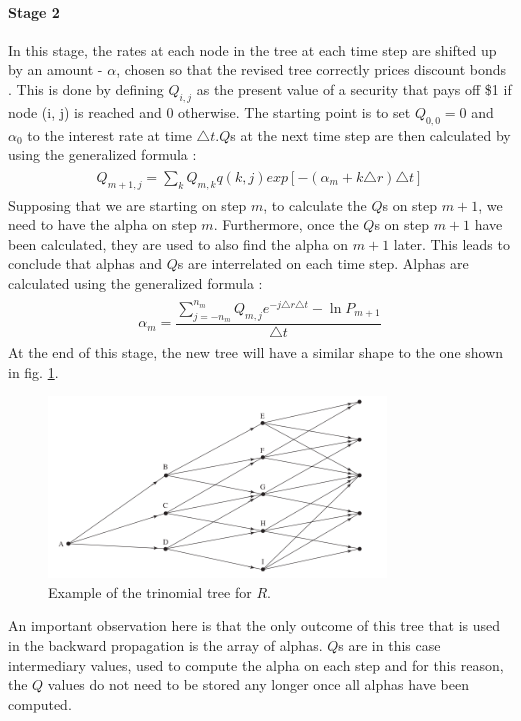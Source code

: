 \paragraph{Stage 2}
In this stage, the rates at each node in the tree at each time step are shifted up by an amount - $\alpha$, chosen so that the revised tree correctly prices discount bonds \cite[pg. 6]{uhwirt}. This is done by defining $Q_{i,j}$ as the present value of a security that pays off \$1 if node (i, j) is reached and 0 otherwise. The starting point is to set $Q_{0,0}=0$ and $\alpha_0$ to the interest rate at time $\triangle t$.$Q$s at the next time step are then calculated by using the generalized formula \cite[pg.705]{ofod}:  
\begin{equation}
\begin{gathered}
\begin{aligned}
Q_{m+1, j} = \sum_k Q_{m,k}q(k,j)exp[-(\alpha_m+k\triangle r)\triangle t]
\nonumber
\end{aligned}
\end{gathered}
\end{equation}
Supposing that we are starting on step $m$, to calculate the $Q$s on step $m+1$, we need to have the alpha on step $m$. Furthermore, once the $Q$s on step $m+1$ have been calculated, they are used to also find the alpha on $m+1$ later. This leads to conclude that alphas and $Q$s are interrelated on each time step. Alphas are calculated using the generalized formula \cite[pg.703]{ofod}:
\begin{equation}
\begin{gathered}
\begin{aligned}
\alpha_{m} = \dfrac{\sum_{j=-n_m}^{n_m} Q_{m,j}e^{-j\triangle r\triangle t} - \ln{P_{m + 1}}}{\triangle t}
\nonumber
\end{aligned}
\end{gathered}
\end{equation}
At the end of this stage, the new tree will have a similar shape to the one shown in fig. \ref{fig:treeconststage2}. 
\begin{figure}[H]
	\centering
	\includegraphics[width=0.8\textwidth]{img/treeconststage2.png}
	\caption{Example of the trinomial tree for $R$.}
	\label{fig:treeconststage2}
\end{figure}
An important observation here is that the only outcome of this tree that is used in the backward propagation is the array of alphas. $Q$s are in this case intermediary values, used to compute the alpha on each step and for this reason, the $Q$ values do not need to be stored any longer once all alphas have been computed. 
